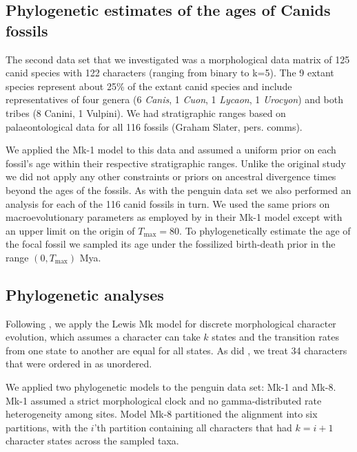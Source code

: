 \documentclass[11pt]{article}
\newcommand{\Mstrict}{{Mk-1}}
\newcommand{\Mrelaxed}{{Mk-8}}
\newcommand{\ncanidfossils}{{116}}
\begin{document}
\subsection*{Phylogenetic estimates of the ages of Canids fossils}

The second data set that we investigated was a morphological data matrix of 125 canid species \cite[9 extant and \ncanidfossils{} fossil;][]{Slater2015} with 122 characters (ranging from binary to k=5).
The 9 extant species represent about 25\% of the extant canid species and include representatives of four genera (6 {\em Canis}, 1 {\em Cuon}, 1 {\em Lycaon}, 1 {\em Urocyon}) and both tribes (8 Canini, 1 Vulpini). 
We had stratigraphic ranges based on palaeontological data for all \ncanidfossils{} fossils (Graham Slater, pers. comms). 

We applied the \Mstrict{} model to this data and assumed a uniform prior on each fossil's age within their respective stratigraphic ranges. Unlike the original study \cite{Slater2015} we did not apply any other constraints or priors on ancestral divergence times beyond the ages of the fossils. 
As with the penguin data set we also performed an analysis for each of the \ncanidfossils{} canid fossils in turn. We used the same priors on macroevolutionary parameters as employed by \cite{gavryushkina2015bayesian} in their \Mstrict{} model except with an upper limit on the origin of $T_\text{max} = 80$. To phylogenetically estimate the age of the focal fossil we sampled its age under the fossilized birth-death prior in the range $(0,T_\text{max})$ Mya.

\subsection*{Phylogenetic analyses}

Following \cite{gavryushkina2015bayesian}, we apply the Lewis Mk model 
\cite{Lewis2001} for discrete morphological character evolution, which assumes a character can take $k$ states and the transition rates from one state to another are equal for all states. As did \cite{gavryushkina2015bayesian}, we treat 34 characters that were ordered in \cite{ksepka2012} as unordered. 

We applied two phylogenetic models to the penguin data set: \Mstrict{} and \Mrelaxed{}. \Mstrict{} assumed a strict morphological clock and no gamma-distributed rate heterogeneity among sites. Model \Mrelaxed{} partitioned the alignment into six partitions, with the $i$'th partition containing all characters that had $k=i+1$ character states across the sampled taxa.
\end{document}
